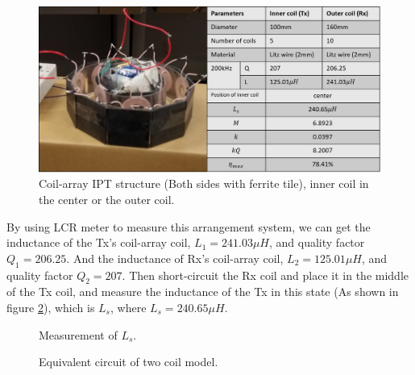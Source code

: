 \begin{figure}[!t]
    \centering
    \includegraphics[width=1.0\linewidth]{images/4_coil_5_10_with_ferrite.png}
    \caption{Coil-array IPT structure (Both sides with ferrite tile), inner coil in the center or the outer coil.}
    \label{fig: 10-5 with ferrite}
\end{figure}
By using LCR meter to measure this arrangement system, we can get the inductance of the Tx's coil-array coil, $L_1 = 241.03 \mu H$, and quality factor $Q_1=206.25$. And the inductance of Rx's coil-array coil, $L_2 = 125.01 \mu H$, and quality factor $Q_2=207$. Then short-circuit the Rx coil and place it in the middle of the Tx coil, and measure the inductance of the Tx in this state (As shown in figure \ref{fig: Ls}), which is $L_s$, where $L_s = 240.65 \mu H$.

\begin{figure}[!b]
    \centering
    \caption{Measurement of $L_s$.}
    \label{fig: Ls}
\end{figure}

\begin{figure}[!t]
    \centering
    \caption{Equivalent circuit of two coil model.}
    \label{fig: Ls eq}
\end{figure}

